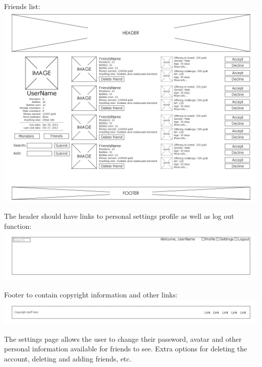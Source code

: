 \documentclass[a4paper]{article}
\begin{document}
Friends list:\\

\includegraphics[width=\textwidth]{img/UI13.jpg}
\clearpage

The header should have links to personal settings profile as well as log out function:\\

\includegraphics[width=\textwidth]{img/UIHeader.jpg}

Footer to contain copyright information and other links:\\

\includegraphics[width=\textwidth]{img/UIFooter.jpg}
\clearpage

The settings page allows the user to change their password, avatar and other personal information available for friends to see. Extra options for deleting the account, deleting and adding friends, etc.\\
\end{document}
